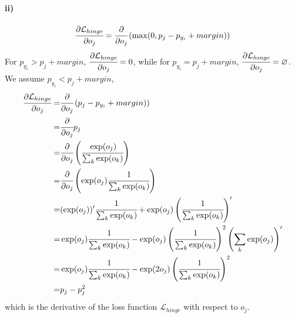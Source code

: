 \documentclass[10pt]{article}
\begin{document}
\paragraph{ii)}\begin{align*}
\cfrac{\partial \mathcal{L}_{hinge}}{\partial o_j} = \cfrac{\partial}{\partial o_j} \left(   \max(0, p_j - p_{y_i} + margin) \right)
\end{align*}
For $p_{y_i} > p_j + margin$, $\cfrac{\partial \mathcal{L}_{hinge}}{\partial o_j} = 0$, while for $p_{y_i} = p_j + margin$, $\cfrac{\partial \mathcal{L}_{hinge}}{\partial o_j} = \varnothing$.
We assume $p_{y_i} < p_j + margin$,
\begin{align*}
\cfrac{\partial \mathcal{L}_{hinge}}{\partial o_j} =& \cfrac{\partial}{\partial o_j} \left(   p_j - p_{y_i} + margin) \right)\\
=& \cfrac{\partial}{\partial o_j} p_j\\
=& \cfrac{\partial}{\partial o_j} \left( \cfrac{\exp(o_j)}{\sum_k \exp(o_k)} \right)\\
=& \cfrac{\partial}{\partial o_j} \left( \exp(o_j) \cfrac{1}{\sum_k \exp(o_k)} \right)\\
=& (\exp(o_j))' \cfrac{1}{\sum_k \exp(o_k)} + \exp(o_j) \left( \cfrac{1}{\sum_k \exp(o_k)} \right)'  \\
=& \exp(o_j) \cfrac{1}{\sum_k \exp(o_k)} - \exp(o_j) \left( \cfrac{1}{\sum_k \exp(o_k)} \right)^2 \left( \sum_k \exp(o_j) \right)'  \\
=& \exp(o_j) \cfrac{1}{\sum_k \exp(o_k)} - \exp(2o_j) \left( \cfrac{1}{\sum_k \exp(o_k)} \right)^2\\
=& p_j - p_j^2
\end{align*}
which is the derivative of the loss function $\mathcal{L}_{hinge}$ with respect to $o_j$.
\end{document}
